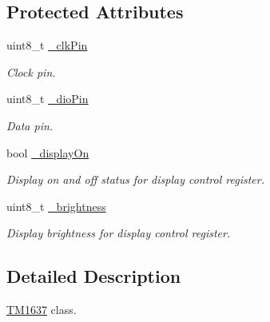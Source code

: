 \subsection*{Protected Attributes}
\begin{DoxyCompactItemize}
\item 
uint8\+\_\+t \hyperlink{class_t_m1637_a2dad2bc57abebb5b6505a09d6aa47d78}{\+\_\+clk\+Pin}\hypertarget{class_t_m1637_a2dad2bc57abebb5b6505a09d6aa47d78}{}\label{class_t_m1637_a2dad2bc57abebb5b6505a09d6aa47d78}

\begin{DoxyCompactList}\small\item\em Clock pin. \end{DoxyCompactList}\item 
uint8\+\_\+t \hyperlink{class_t_m1637_a6ab8b8312635f0d44d3a130ec05fb3a7}{\+\_\+dio\+Pin}\hypertarget{class_t_m1637_a6ab8b8312635f0d44d3a130ec05fb3a7}{}\label{class_t_m1637_a6ab8b8312635f0d44d3a130ec05fb3a7}

\begin{DoxyCompactList}\small\item\em Data pin. \end{DoxyCompactList}\item 
bool \hyperlink{class_t_m1637_afd380f891e9e2b9f9d33afa126f2d863}{\+\_\+display\+On}\hypertarget{class_t_m1637_afd380f891e9e2b9f9d33afa126f2d863}{}\label{class_t_m1637_afd380f891e9e2b9f9d33afa126f2d863}

\begin{DoxyCompactList}\small\item\em Display on and off status for display control register. \end{DoxyCompactList}\item 
uint8\+\_\+t \hyperlink{class_t_m1637_a302a35be119d235cdeb67dde021fbd5c}{\+\_\+brightness}\hypertarget{class_t_m1637_a302a35be119d235cdeb67dde021fbd5c}{}\label{class_t_m1637_a302a35be119d235cdeb67dde021fbd5c}

\begin{DoxyCompactList}\small\item\em Display brightness for display control register. \end{DoxyCompactList}\end{DoxyCompactItemize}


\subsection{Detailed Description}
\hyperlink{class_t_m1637}{T\+M1637} class. 


